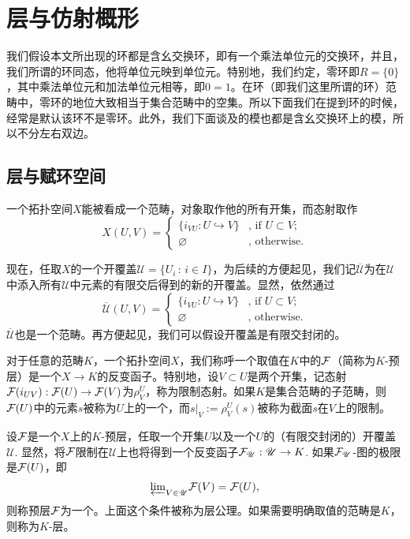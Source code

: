 
\chapter{层与仿射概形}

我们假设本文所出现的环都是含幺交换环，即有一个乘法单位元的交换环，并且，我们所谓的环同态，他将单位元映到单位元。特别地，我们约定，零环即$R=\{0\}$，其中乘法单位元和加法单位元相等，即$0=1$。在环（即我们这里所谓的环）范畴中，零环的地位大致相当于集合范畴中的空集。所以下面我们在提到环的时候，经常是默认该环不是零环。此外，我们下面谈及的模也都是含幺交换环上的模，所以不分左右双边。

\section{层与赋环空间}

\begin{para}
一个拓扑空间$X$能被看成一个范畴，对象取作他的所有开集，而态射取作
\[
	X(U,V)=\begin{cases}
	\bigl\{i_{VU}:U\hookrightarrow V\bigr\}&\text{, if }U\subset V\text{;}\\
	\varnothing&\text{, otherwise}.
	\end{cases}
\]

现在，任取$X$的一个开覆盖$\mathscr{U}=\{U_i\,:\, i\in I\}$，为后续的方便起见，我们记$\overline{\mathscr{U}}$为在$\mathscr{U}$中添入所有$\mathscr{U}$中元素的有限交后得到的新的开覆盖。显然，依然通过
\[
	\overline{\mathscr{U}}(U,V)=\begin{cases}
	\bigl\{i_{VU}:U\hookrightarrow V\bigr\}&\text{, if }U\subset V\text{;}\\
	\varnothing&\text{, otherwise}.
	\end{cases}
\]
$\overline{\mathscr{U}}$也是一个范畴。再方便起见，我们可以假设开覆盖是有限交封闭的。
\end{para}

\begin{para}
对于任意的范畴$K$，一个拓扑空间$X$，我们称呼一个取值在$K$中的$\mathcal{F}$（简称为$K$-预层）是一个$X\to K$的反变函子。特别地，设$V\subset U$是两个开集，记态射$\mathcal{F}(i_{UV}):\mathcal{F}(U)\to \mathcal{F}(V)$为$\rho^U_{V}$，称为限制态射。如果$K$是集合范畴的子范畴，则$\mathcal{F}(U)$中的元素$s$被称为$U$上的一个，而$s|_V:=\rho^U_V(s)$被称为截面$s$在$V$上的限制。

设$\mathcal{F}$是一个$X$上的$K$-预层，任取一个开集$U$以及一个$U$的（有限交封闭的）开覆盖$\mathscr{U}$. 显然，将$\mathcal{F}$限制在$\mathscr{U}$上也将得到一个反变函子$\mathcal{F}_\mathscr{U}:\mathscr{U}\to K$. 如果$\mathcal{F}_\mathscr{U}$-图的极限是$\mathcal{F}(U)$，即
\[
	{\varprojlim}_{V\in \mathscr{U}}\mathcal{F}(V)=\mathcal{F}(U),
\]
则称预层$\mathcal{F}$为一个。上面这个条件被称为层公理。如果需要明确取值的范畴是$K$，则称为$K$-层。
\end{para}

